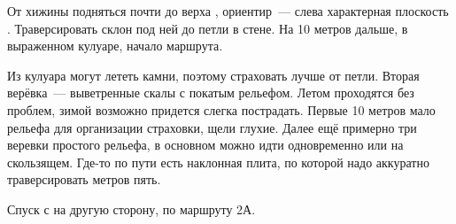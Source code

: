 От хижины \geoLighthouse{} подняться почти до верха
, ориентир~--- слева характерная
плоскость \geoTelevizor{}. Траверсировать склон под ней до петли в
стене. На 10 метров дальше, в выраженном кулуаре, начало маршрута.

Из кулуара могут лететь камни, поэтому страховать лучше от петли.
Вторая верёвка~--- выветренные скалы с покатым рельефом. Летом
проходятся без проблем, зимой возможно придется слегка пострадать.
Первые 10 метров мало рельефа для организации страховки, щели глухие.
Далее ещё примерно три веревки простого рельефа, в основном можно идти
одновременно или на скользящем. Где-то по пути есть наклонная плита,
по которой надо аккуратно траверсировать метров пять.

Спуск с \geoPeakRacek[вершины] на другую сторону, по маршруту 2А.
